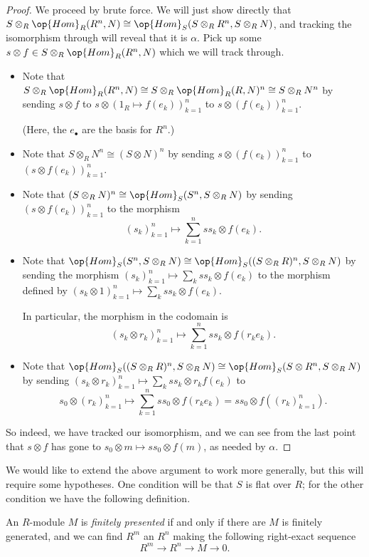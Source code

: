 \begin{proof}
	We proceed by brute force. We will just show directly that $S\otimes_R\op{Hom}_R(R^n,N)\cong\op{Hom}_S(S\otimes_RR^n,S\otimes_RN)$, and tracking the isomorphism through will reveal that it is $\alpha$. Pick up some $s\otimes f\in S\otimes_R\op{Hom}_R(R^n,N)$ which we will track through.
	\begin{itemize}
		\item Note that $S\otimes_R\op{Hom}_R(R^n,N)\cong S\otimes_R\op{Hom}_R(R,N)^n\cong S\otimes_RN^n$ by sending $s\otimes f$ to $s\otimes(1_R\mapsto f(e_k))_{k=1}^n$ to $s\otimes(f(e_k))_{k=1}^n$.
		
		(Here, the $e_\bullet$ are the basis for $R^n$.)
		\item Note that $S\otimes_RN^n\cong(S\otimes N)^n$ by sending $s\otimes(f(e_k))_{k=1}^n$ to $(s\otimes f(e_k))_{k=1}^n$.
		\item Note that $(S\otimes_RN)^n\cong\op{Hom}_S(S^n,S\otimes_RN)$ by sending $(s\otimes f(e_k))_{k=1}^n$ to the morphism
		\[(s_k)_{k=1}^n\mapsto\sum_{k=1}^nss_k\otimes f(e_k).\]
		\item Note that $\op{Hom}_S(S^n,S\otimes_RN)\cong\op{Hom}_S((S\otimes_RR)^n,S\otimes_RN)$ by sending the morphism $(s_k)_{k=1}^n\mapsto\sum_kss_k\otimes f(e_k)$ to the morphism defined by $(s_k\otimes1)_{k=1}^n\mapsto\sum_kss_k\otimes f(e_k)$.
		
		In particular, the morphism in the codomain is
		\[(s_k\otimes r_k)_{k=1}^n\mapsto\sum_{k=1}^nss_k\otimes f(r_ke_k).\]
		\item Note that $\op{Hom}_S((S\otimes_RR)^n,S\otimes_RN)\cong\op{Hom}_S(S\otimes R^n,S\otimes_RN)$ by sending $(s_k\otimes r_k)_{k=1}^n\mapsto\sum_k ss_k\otimes r_kf(e_k)$ to
		\[s_0\otimes(r_k)_{k=1}^n\mapsto\sum_{k=1}^nss_0\otimes f(r_ke_k)=ss_0\otimes f\left((r_k)_{k=1}^n\right).\]
	\end{itemize}
	So indeed, we have tracked our isomorphism, and we can see from the last point that $s\otimes f$ has gone to $s_0\otimes m\mapsto ss_0\otimes f(m)$, as needed by $\alpha$.
\end{proof}
We would like to extend the above argument to work more generally, but this will require some hypotheses. One condition will be that $S$ is flat over $R$; for the other condition we have the following definition.
\begin{definition}
	An $R$-module $M$ is \textit{finitely presented} if and only if there are $M$ is finitely generated, and we can find $R^m$ an $R^n$ making the following right-exact sequence
	\[R^m\to R^n\to M\to 0.\]
\end{definition}
